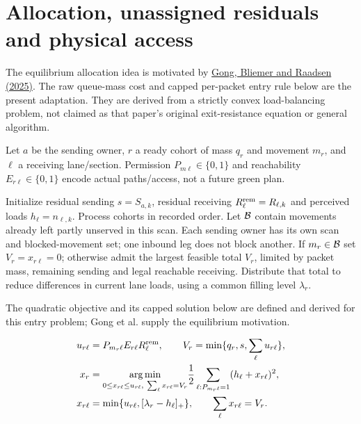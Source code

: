 \documentclass[10pt,a4paper]{article}
\newcommand{\pos}[1]{[#1]_+}
\begin{document}
\section{Allocation, unassigned residuals and physical access}


The equilibrium allocation idea is motivated by
\href{https://doi.org/10.1016/j.trb.2025.103208}{Gong, Bliemer and Raadsen (2025)}.
The raw queue-mass cost and capped per-packet entry rule below are the
present adaptation. They are derived from a strictly convex load-balancing
problem, not claimed as that paper's original exit-resistance equation
or general algorithm.
\par

Let $a$ be the sending owner, $r$ a ready cohort of mass $q_r$ and
movement $m_r$, and $\ell$ a receiving lane/section.
Permission $P_{m\ell}\in\{0,1\}$ and reachability
$E_{r\ell}\in\{0,1\}$ encode actual paths/access, not a future green plan.

Initialize residual sending $s=S_{a,k}$, residual receiving
$R^{\rm rem}_\ell=R_{\ell,k}$ and perceived loads $h_\ell=n_{\ell,k}$.
Process cohorts in recorded order. Let ${\cal B}$ contain movements
already left partly unserved in this scan. Each sending owner has its own
scan and blocked-movement set; one inbound leg does not block another.
If $m_r\in{\cal B}$ set $V_r=x_{r\ell}=0$; otherwise admit the largest
feasible total $V_r$, limited by packet mass, remaining sending and
legal reachable receiving. Distribute that total to reduce differences
in current lane loads, using a common filling level $\lambda_r$.
\par\begin{samepage}
The quadratic objective and its capped solution below are defined and derived for this entry problem; Gong et al. supply the equilibrium motivation.

\begin{align}
 u_{r\ell}&=P_{m_r\ell}E_{r\ell}R^{\rm rem}_\ell,\qquad
 V_r=\min\{q_r,s,\sum_\ell u_{r\ell}\},\nonumber\\
 x_r&=\underset{0\leq x_{r\ell}\leq u_{r\ell},\
                    \sum_\ell x_{r\ell}=V_r}{\arg\min}
          \frac12\sum_{\ell:P_{m_r\ell}=1}(h_\ell+x_{r\ell})^2,
 \nonumber\\
 x_{r\ell}&=\min\{u_{r\ell},\pos{\lambda_r-h_\ell}\},\qquad
                    \sum_\ell x_{r\ell}=V_r .
 \label{eq:allocation}
\end{align}
\par\end{samepage}
\end{document}

